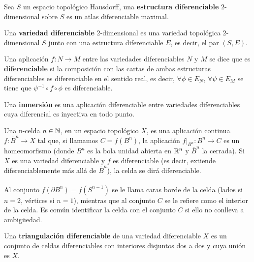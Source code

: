 \begin{definicion} Sea $S$ un espacio topológico Hausdorff, una \textbf{estructura diferenciable} $2$-dimensional sobre $S$ es un atlas diferenciable maximal.
\end{definicion}

\begin{definicion} Una \textbf{variedad diferenciable} 2-dimensional es una variedad topológica $2$-dimensional $S$ junto con una estructura diferenciable $E$, es decir, el par $(S, E)$.
\end{definicion}

\begin{definicion} Una aplicación $f: N \rightarrow M$ entre las variedades diferenciables $N$ y $M$ se dice que es \textbf{diferenciable} si la composición con las cartas de ambas estructuras diferenciables es diferenciable en el sentido real, es decir, $\forall \phi \in E_N$, $\forall \psi \in E_M$ se tiene que $\psi^{-1} \circ f \circ \phi$ es diferenciable.
\end{definicion}

\begin{definicion} Una \textbf{inmersión} es una aplicación diferenciable entre variedades diferenciables cuya diferencial es inyectiva en todo punto.
\end{definicion}

\begin{definicion} Una n-celda $n \in \mathbb{N}$, en un espacio topológico $X$, es una aplicación continua $f: \overline{B}^n \rightarrow X$ tal que, si llamamos $C=f(B^n)$, la aplicación $f|_{B^n}:B^n \rightarrow C$ es un homeomorfismo (donde $B^n$ es la bola unidad abierta en $\mathbb{R}^n$ y $\overline{B}^n$ la cerrada). Si $X$ es una variedad diferenciable y $f$ es diferenciable (es decir, extiende diferenciablemente más allá de $\overline{B}^n$), la celda se dirá diferenciable.\\
\\Al conjunto $f(\partial B^n)=f(S^{n-1})$ se le llama caras borde de la celda (lados si $n=2$, vértices si $n=1$), mientras que al conjunto $C$ se le refiere como el interior de la celda. Es común identificar la celda con el conjunto $C$ si ello no conlleva a ambigüedad.
\end{definicion}

\begin{definicion} Una \textbf{triangulación diferenciable} de una variedad diferenciable $X$ es un conjunto de celdas diferenciables con interiores disjuntos dos a dos y cuya unión es $X$.
\end{definicion}

